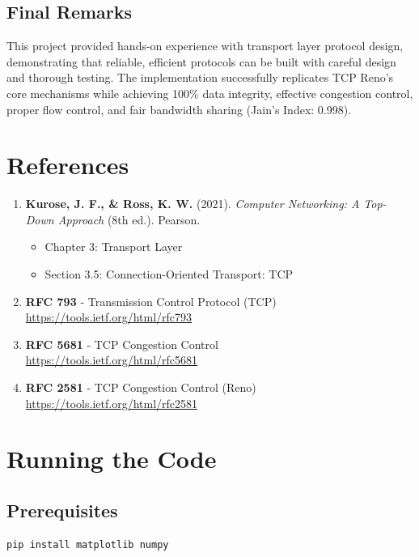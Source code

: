 \documentclass[11pt,a4paper]{article}
\begin{document}
\subsection{Final Remarks}

This project provided hands-on experience with transport layer protocol design, demonstrating that reliable, efficient protocols can be built with careful design and thorough testing. The implementation successfully replicates TCP Reno's core mechanisms while achieving 100\% data integrity, effective congestion control, proper flow control, and fair bandwidth sharing (Jain's Index: 0.998).

\section{References}

\begin{enumerate}
    \item \textbf{Kurose, J. F., \& Ross, K. W.} (2021). \textit{Computer Networking: A Top-Down Approach} (8th ed.). Pearson.
    \begin{itemize}
        \item Chapter 3: Transport Layer
        \item Section 3.5: Connection-Oriented Transport: TCP
    \end{itemize}
    
    \item \textbf{RFC 793} - Transmission Control Protocol (TCP) \\
    \url{https://tools.ietf.org/html/rfc793}
    
    \item \textbf{RFC 5681} - TCP Congestion Control \\
    \url{https://tools.ietf.org/html/rfc5681}
    
    \item \textbf{RFC 2581} - TCP Congestion Control (Reno) \\
    \url{https://tools.ietf.org/html/rfc2581}

\end{enumerate}

\appendix

\section{Running the Code}

\subsection{Prerequisites}
\begin{lstlisting}[language=bash]
pip install matplotlib numpy
\end{lstlisting}
\end{document}
